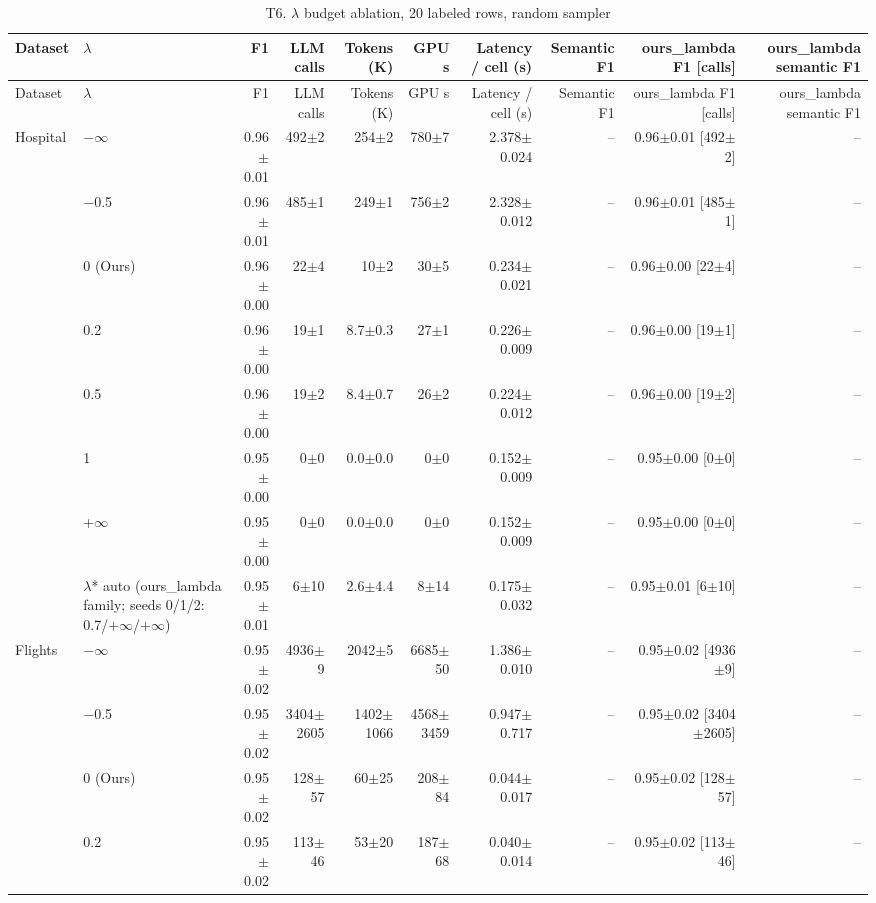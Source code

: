{\footnotesize
\begin{longtable}{llrrrrrrrr}
\caption{T6. $\lambda$ budget ablation, 20 labeled rows, random sampler}\label{tab:T6}\\
\toprule
Dataset & $\lambda$ & F1 & LLM calls & Tokens (K) & GPU s & Latency / cell (s) & Semantic F1 & ours\_lambda F1 [calls] & ours\_lambda semantic F1 \\
\midrule
\endfirsthead
\toprule
Dataset & $\lambda$ & F1 & LLM calls & Tokens (K) & GPU s & Latency / cell (s) & Semantic F1 & ours\_lambda F1 [calls] & ours\_lambda semantic F1 \\
\midrule
\endhead
\bottomrule
\endfoot
Hospital & $-$$\infty$ & 0.96$\pm$0.01 & 492$\pm$2 & 254$\pm$2 & 780$\pm$7 & 2.378$\pm$0.024 & -- & 0.96$\pm$0.01 [492$\pm$2] & -- \\
 & $-$0.5 & 0.96$\pm$0.01 & 485$\pm$1 & 249$\pm$1 & 756$\pm$2 & 2.328$\pm$0.012 & -- & 0.96$\pm$0.01 [485$\pm$1] & -- \\
 & 0 (Ours) & 0.96$\pm$0.00 & 22$\pm$4 & 10$\pm$2 & 30$\pm$5 & 0.234$\pm$0.021 & -- & 0.96$\pm$0.00 [22$\pm$4] & -- \\
 & 0.2 & 0.96$\pm$0.00 & 19$\pm$1 & 8.7$\pm$0.3 & 27$\pm$1 & 0.226$\pm$0.009 & -- & 0.96$\pm$0.00 [19$\pm$1] & -- \\
 & 0.5 & 0.96$\pm$0.00 & 19$\pm$2 & 8.4$\pm$0.7 & 26$\pm$2 & 0.224$\pm$0.012 & -- & 0.96$\pm$0.00 [19$\pm$2] & -- \\
 & 1 & 0.95$\pm$0.00 & 0$\pm$0 & 0.0$\pm$0.0 & 0$\pm$0 & 0.152$\pm$0.009 & -- & 0.95$\pm$0.00 [0$\pm$0] & -- \\
 & +$\infty$ & 0.95$\pm$0.00 & 0$\pm$0 & 0.0$\pm$0.0 & 0$\pm$0 & 0.152$\pm$0.009 & -- & 0.95$\pm$0.00 [0$\pm$0] & -- \\
 & $\lambda$* auto (ours\_lambda family; seeds 0/1/2: 0.7/+$\infty$/+$\infty$) & 0.95$\pm$0.01 & 6$\pm$10 & 2.6$\pm$4.4 & 8$\pm$14 & 0.175$\pm$0.032 & -- & 0.95$\pm$0.01 [6$\pm$10] & -- \\
\midrule
Flights & $-$$\infty$ & 0.95$\pm$0.02 & 4936$\pm$9 & 2042$\pm$5 & 6685$\pm$50 & 1.386$\pm$0.010 & -- & 0.95$\pm$0.02 [4936$\pm$9] & -- \\
 & $-$0.5 & 0.95$\pm$0.02 & 3404$\pm$2605 & 1402$\pm$1066 & 4568$\pm$3459 & 0.947$\pm$0.717 & -- & 0.95$\pm$0.02 [3404$\pm$2605] & -- \\
 & 0 (Ours) & 0.95$\pm$0.02 & 128$\pm$57 & 60$\pm$25 & 208$\pm$84 & 0.044$\pm$0.017 & -- & 0.95$\pm$0.02 [128$\pm$57] & -- \\
 & 0.2 & 0.95$\pm$0.02 & 113$\pm$46 & 53$\pm$20 & 187$\pm$68 & 0.040$\pm$0.014 & -- & 0.95$\pm$0.02 [113$\pm$46] & -- \\

\end{longtable}}
